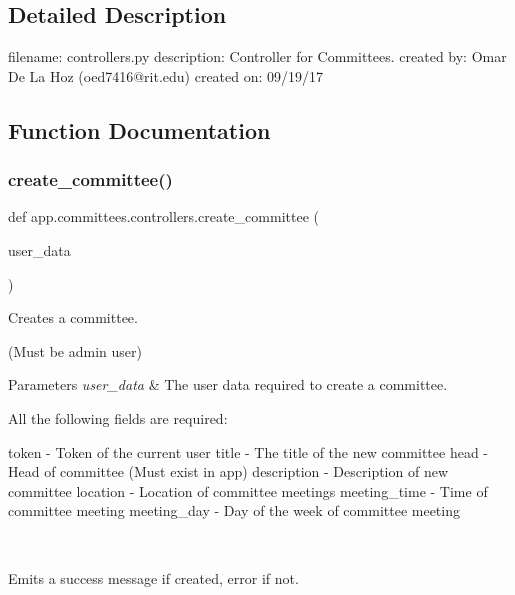 \subsection{Detailed Description}
\begin{DoxyVerb}filename: controllers.py
description: Controller for Committees.
created by: Omar De La Hoz (oed7416@rit.edu)
created on: 09/19/17
\end{DoxyVerb}
 

\subsection{Function Documentation}
\mbox{\label{namespaceapp_1_1committees_1_1controllers_a43d988c96e26843d6b0fa328bfbfca5e}} 
\subsubsection{\texorpdfstring{create\+\_\+committee()}{create\_committee()}}
{\footnotesize\ttfamily def app.\+committees.\+controllers.\+create\+\_\+committee (\begin{DoxyParamCaption}\item[{}]{user\+\_\+data }\end{DoxyParamCaption})}



Creates a committee. 

(Must be admin user)


\begin{DoxyParams}{Parameters}
{\em user\+\_\+data} & The user data required to create a committee. \begin{DoxyVerb}                    All the following fields are required:

                    token - Token of the current user
                    title - The title of the new committee 
                    head - Head of committee (Must exist in app)
                    description - Description of new committee
                    location - Location of committee meetings
                    meeting_time - Time of committee meeting
                    meeting_day - Day of the week of committee meeting
\end{DoxyVerb}
\\
\hline
\end{DoxyParams}
Emits a success message if created, error if not. \mbox{\label{namespaceapp_1_1committees_1_1controllers_a1be50a5e100f6e73441b49cda5fef1e0}} 
